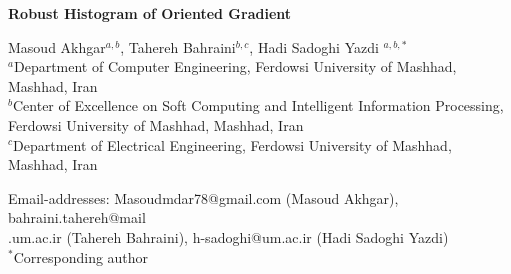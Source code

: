 \documentclass{elsarticle}
\begin{document}
	\begin{titlepage}
		\begin{center}
			\vspace*{1cm}
			\textbf{Robust Histogram of Oriented Gradient}
			
			\vspace{1cm}
			
		    Masoud Akhgar$^{a,b}$, Tahereh Bahraini$^{b,c}$, Hadi Sadoghi Yazdi $^{a,b,*}$\\
			\vspace{0.7cm}
			$^{a}$Department of Computer Engineering, Ferdowsi University of Mashhad, Mashhad, Iran\\
			$^{b}$Center of Excellence on Soft Computing and Intelligent Information Processing, Ferdowsi University of Mashhad, Mashhad, Iran \\
			$^{c}$Department of Electrical Engineering, Ferdowsi University of Mashhad, Mashhad, Iran\\
			
		\end{center}
		Email-addresses: Masoudmdar78@gmail.com (Masoud Akhgar), bahraini.tahereh@mail\\.um.ac.ir  (Tahereh Bahraini), h-sadoghi@um.ac.ir (Hadi Sadoghi Yazdi)\\
		
		$^{*}$Corresponding author
	\end{titlepage}
\end{document}
